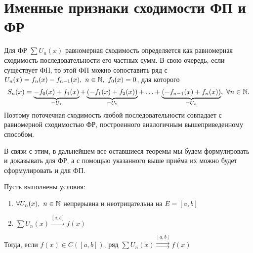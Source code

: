 \documentclass[../../main.tex]{subfiles}
\begin{document}
\section{Именные признаки сходимости ФП и ФР}

Для ФР $\sum U_n(x)$ равномерная сходимость определяется как 
равномерная сходимость последовательности его частных сумм. В свою очередь,
если существует ФП, то этой ФП можно сопоставить ряд с 
$U_n(x) = f_n(x) - f_{n-1}(x),\ n \in \mathbb{N},\ f_0(x) = 0$, для которого
\[
S_n(x) = \underbrace{-f_0(x) + f_1(x)}_{= U_1} + 
\underbrace{(-f_1(x) + f_2(x))}_{= U_2} + \ldots +
\underbrace{(-f_{n-1}(x) + f_n(x))}_{= U_n},\ \forall n \in \mathbb{N}.	
\]
Поэтому поточечная сходимость любой последовательности совпадает с 
равномерной сходимостью ФР, построенного аналогичным вышеприведенному
способом.

В связи с этим, в дальнейшем все оставшиеся теоремы мы будем формулировать
и доказывать для ФР, а с помощью указанного выше приёма их можно будет
сформулировать и для ФП.

\begin{thm}
Пусть выполнены условия:

	\begin{enumerate}
		\item $\forall U_n(x),\ n \in \mathbb{N}$ непрерывна и неотрицательна на
	$E=[a,b]$
		\item $\sum U_n(x) \overset{[a,b]}{\longrightarrow} f(x)$
	\end{enumerate}
Тогда, если $f(x) \in C([a,b])$, ряд 
$\sum U_n(x) \overset{[a,b]}{\rightrightarrows} f(x)$
\end{thm}	
\end{document}
